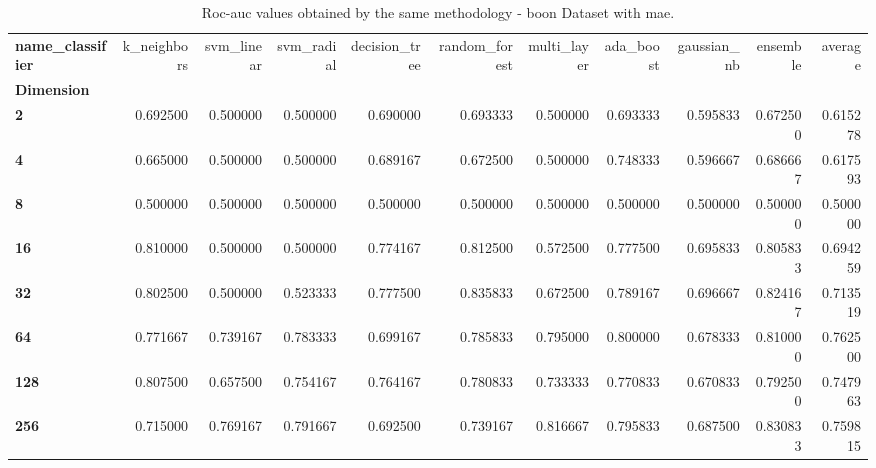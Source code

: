 \begin{table}
\centering
\caption{Roc-auc values obtained by the same methodology - boon Dataset with mae.}
\label{roc-auc_boon_mae-reproduction}
\begin{tabular}{lrrrrrrrrrr}
\toprule
\textbf{name\_classifier} &  k\_neighbors &  svm\_linear &  svm\_radial &  decision\_tree &  random\_forest &  multi\_layer &  ada\_boost &  gaussian\_nb &  ensemble &   average \\
\textbf{Dimension} &              &             &             &                &                &              &            &              &           &           \\
\midrule
\textbf{2        } &     0.692500 &    0.500000 &    0.500000 &       0.690000 &       0.693333 &     0.500000 &   0.693333 &     0.595833 &  0.672500 &  0.615278 \\
\textbf{4        } &     0.665000 &    0.500000 &    0.500000 &       0.689167 &       0.672500 &     0.500000 &   0.748333 &     0.596667 &  0.686667 &  0.617593 \\
\textbf{8        } &     0.500000 &    0.500000 &    0.500000 &       0.500000 &       0.500000 &     0.500000 &   0.500000 &     0.500000 &  0.500000 &  0.500000 \\
\textbf{16       } &     0.810000 &    0.500000 &    0.500000 &       0.774167 &       0.812500 &     0.572500 &   0.777500 &     0.695833 &  0.805833 &  0.694259 \\
\textbf{32       } &     0.802500 &    0.500000 &    0.523333 &       0.777500 &       0.835833 &     0.672500 &   0.789167 &     0.696667 &  0.824167 &  0.713519 \\
\textbf{64       } &     0.771667 &    0.739167 &    0.783333 &       0.699167 &       0.785833 &     0.795000 &   0.800000 &     0.678333 &  0.810000 &  0.762500 \\
\textbf{128      } &     0.807500 &    0.657500 &    0.754167 &       0.764167 &       0.780833 &     0.733333 &   0.770833 &     0.670833 &  0.792500 &  0.747963 \\
\textbf{256      } &     0.715000 &    0.769167 &    0.791667 &       0.692500 &       0.739167 &     0.816667 &   0.795833 &     0.687500 &  0.830833 &  0.759815 \\
\bottomrule
\end{tabular}
\end{table}
